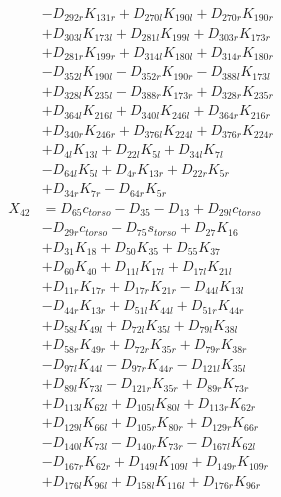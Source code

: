 \begin{multicols}{2}
\begin{align}
&- D_{292r}K_{131r} + D_{270l}K_{190l} + D_{270r}K_{190r}  \nonumber \\
&+ D_{303l}K_{173l} + D_{281l}K_{199l} + D_{303r}K_{173r}  \nonumber \\
&+ D_{281r}K_{199r} + D_{314l}K_{180l} + D_{314r}K_{180r}  \nonumber \\
&- D_{352l}K_{190l} - D_{352r}K_{190r} - D_{388l}K_{173l}  \nonumber \\
&+ D_{328l}K_{235l} - D_{388r}K_{173r} + D_{328r}K_{235r}  \nonumber \\
&+ D_{364l}K_{216l} + D_{340l}K_{246l} + D_{364r}K_{216r}  \nonumber \\
&+ D_{340r}K_{246r} + D_{376l}K_{224l} + D_{376r}K_{224r}  \nonumber \\
&+ D_{4l}K_{13l} + D_{22l}K_{5l} + D_{34l}K_{7l}  \nonumber \\
&- D_{64l}K_{5l} + D_{4r}K_{13r} + D_{22r}K_{5r}  \nonumber \\
&+ D_{34r}K_{7r} - D_{64r}K_{5r} \nonumber \\
X_{42} &= D_{65}c_{torso} - D_{35} - D_{13} + D_{29l}c_{torso}  \nonumber \\
&- D_{29r}c_{torso} - D_{75}s_{torso} + D_{27}K_{16}  \nonumber \\
&+ D_{31}K_{18} + D_{50}K_{35} + D_{55}K_{37}  \nonumber \\
&+ D_{60}K_{40} + D_{11l}K_{17l} + D_{17l}K_{21l}  \nonumber \\
&+ D_{11r}K_{17r} + D_{17r}K_{21r} - D_{44l}K_{13l}  \nonumber \\
&- D_{44r}K_{13r} + D_{51l}K_{44l} + D_{51r}K_{44r}  \nonumber \\
&+ D_{58l}K_{49l} + D_{72l}K_{35l} + D_{79l}K_{38l}  \nonumber \\
&+ D_{58r}K_{49r} + D_{72r}K_{35r} + D_{79r}K_{38r}  \nonumber \\
&- D_{97l}K_{44l} - D_{97r}K_{44r} - D_{121l}K_{35l}  \nonumber \\
&+ D_{89l}K_{73l} - D_{121r}K_{35r} + D_{89r}K_{73r}  \nonumber \\
&+ D_{113l}K_{62l} + D_{105l}K_{80l} + D_{113r}K_{62r}  \nonumber \\
&+ D_{129l}K_{66l} + D_{105r}K_{80r} + D_{129r}K_{66r}  \nonumber \\
&- D_{140l}K_{73l} - D_{140r}K_{73r} - D_{167l}K_{62l}  \nonumber \\
&- D_{167r}K_{62r} + D_{149l}K_{109l} + D_{149r}K_{109r}  \nonumber \\
&+ D_{176l}K_{96l} + D_{158l}K_{116l} + D_{176r}K_{96r}  \nonumber \\

\end{align}
\end{multicols}
